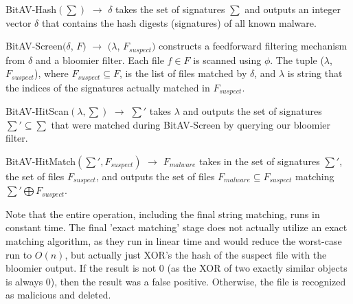 \documentclass[12pt,journal]{IEEEtran}
\begin{document}
\begin{LaTeXdescription}
\item[BitAV-Hash$(\sum)$ $\rightarrow$ $\delta$] takes the set of signatures $\sum$ and outputs an integer vector $\delta$ that contains the hash digests (signatures) of all known malware.

\item[BitAV-Screen$(\delta$, $F)$ $\rightarrow$ $(\lambda$, $F_{suspect})$] constructs a feedforward filtering mechanism from $\delta$ and a bloomier filter. Each file $f \in F$ is scanned using $\phi$. 
The tuple ($\lambda$, $F_{suspect}$), where $F_{suspect} \subseteq F$, is the list of files matched by $\delta$, and $\lambda$ is string that the indices of the signatures actually matched in $F_{suspect}$.

\item[BitAV-HitScan$(\lambda, \sum)$ $\rightarrow$ $\sum'$] takes $\lambda$ and outputs the set of signatures $\sum' \subseteq \sum$ that were matched during BitAV-Screen by querying our bloomier filter.

\item[BitAV-HitMatch$(\sum', F_{suspect})$ $\rightarrow$ $F_{malware}$] takes in the set of signatures $\sum'$, the set of files $F_{suspect}$, and outputs the set of files $F_{malware} \subseteq F_{suspect}$  matching $\sum' \bigoplus F_{suspect}$.
\end{LaTeXdescription}

Note that the entire operation, including the final string matching, runs in constant time. The final 'exact matching' stage does not actually utilize an exact matching algorithm, as they run in linear time and would reduce the worst-case run to $O(n)$, but actually just XOR's the hash of the suspect file with the bloomier output. If the result is not 0 (as the XOR of two exactly similar objects is always 0), then the result was a false positive. Otherwise, the file is recognized as malicious and deleted. 
\end{document}
